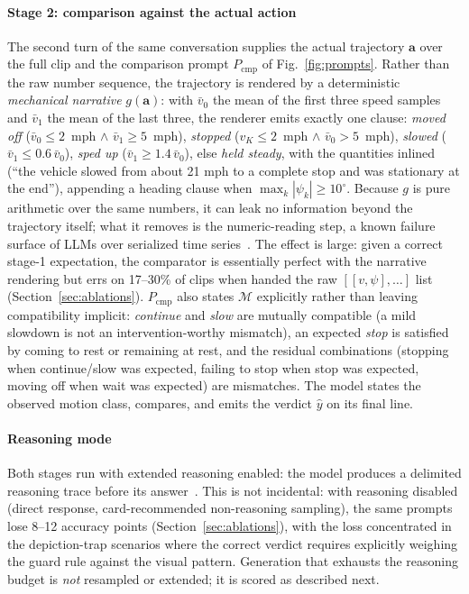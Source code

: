 \documentclass[conference]{IEEEtran}
\newcommand{\act}{\boldsymbol{a}}          %
\newcommand{\Mcal}{\mathcal{M}}            %
\begin{document}
\paragraph{Stage 2: comparison against the actual action} The second turn of the same conversation supplies the actual trajectory $\act$ over the full clip and the comparison prompt $P_{\mathrm{cmp}}$ of Fig.~\ref{fig:prompts}. Rather than the raw number sequence, the trajectory is rendered by a deterministic \emph{mechanical narrative} $g(\act)$: with $\bar{v}_0$ the mean of the first three speed samples and $\bar{v}_1$ the mean of the last three, the renderer emits exactly one clause: \emph{moved off} ($\bar{v}_0 \leq 2$~mph $\wedge$ $\bar{v}_1 \geq 5$~mph), \emph{stopped} ($v_K \leq 2$~mph $\wedge$ $\bar{v}_0 > 5$~mph), \emph{slowed} ($\bar{v}_1 \leq 0.6\,\bar{v}_0$), \emph{sped up} ($\bar{v}_1 \geq 1.4\,\bar{v}_0$), else \emph{held steady}, with the quantities inlined (``the vehicle slowed from about 21 mph to a complete stop and was stationary at the end''), appending a heading clause when $\max_k |\psi_k| \geq 10^{\circ}$. Because $g$ is pure arithmetic over the same numbers, it can leak no information beyond the trajectory itself; what it removes is the numeric-reading step, a known failure surface of LLMs over serialized time series~\cite{b35,b36}. The effect is large: given a correct stage-1 expectation, the comparator is essentially perfect with the narrative rendering but errs on 17--30\% of clips when handed the raw $[[v, \psi], \dots]$ list (Section~\ref{sec:ablations}). $P_{\mathrm{cmp}}$ also states $\Mcal$ explicitly rather than leaving compatibility implicit: \emph{continue} and \emph{slow} are mutually compatible (a mild slowdown is not an intervention-worthy mismatch), an expected \emph{stop} is satisfied by coming to rest or remaining at rest, and the residual combinations (stopping when continue/slow was expected, failing to stop when stop was expected, moving off when wait was expected) are mismatches. The model states the observed motion class, compares, and emits the verdict $\hat{y}$ on its final line.

\paragraph{Reasoning mode} Both stages run with extended reasoning enabled: the model produces a delimited reasoning trace before its answer~\cite{b33,b37}. This is not incidental: with reasoning disabled (direct response, card-recommended non-reasoning sampling), the same prompts lose 8--12 accuracy points (Section~\ref{sec:ablations}), with the loss concentrated in the depiction-trap scenarios where the correct verdict requires explicitly weighing the guard rule against the visual pattern. Generation that exhausts the reasoning budget is \emph{not} resampled or extended; it is scored as described next.
\end{document}
